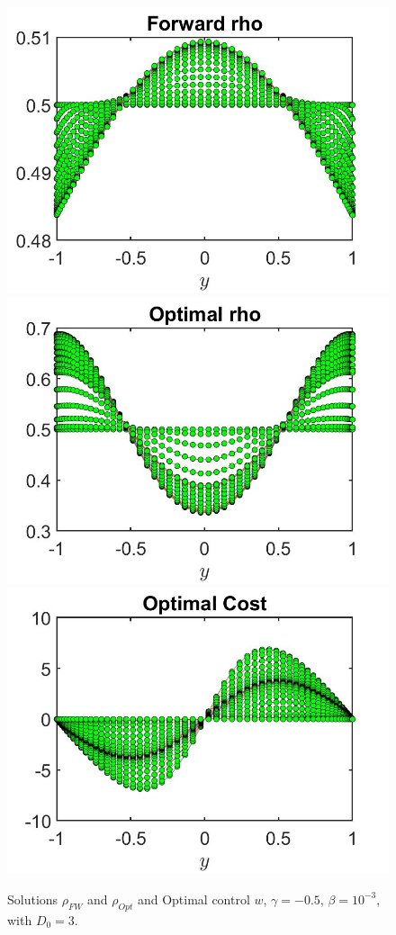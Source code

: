 \documentclass[11pt, a4paper]{article}
\theoremstyle{definition}
\begin{document}
\begin{figure}[h]
	\includegraphics[scale=0.3]{rhoFW0305D03.jpg}	\includegraphics[scale=0.3]{rhoOpt0305D03.jpg}
	\includegraphics[scale=0.3]{wOpt0305D03.jpg}
	\caption{Solutions $\rho_{FW}$ and $\rho_{Opt}$ and Optimal control $w$, $\gamma = - 0.5$, $\beta = 10^{-3}$, with $D_0 = 3$.}
	\label{rho00305D03a}
\end{figure}
\end{document}
